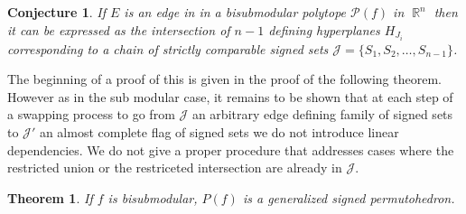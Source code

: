 \documentclass[12pt]{amsart}
\newtheorem{theorem}[lemma]{Theorem}
\newtheorem{conj}[lemma]{Conjecture}
\numberwithin{equation}{section}
\newcommand{\RR}{\operatorname{\mathbb{R}}}
\newcommand{\pp}{\mathcal{P}}
\newcommand{\J}{\mathcal{J}}
\begin{document}
\vspace{.5cm}           %


\begin{conj}
\label{conj:comparableSignedSets}
If $E$ is an edge in in a bisubmodular polytope $\pp(f)$ in $\RR^n$ then it can be expressed 
as the intersection of $n-1$ defining hyperplanes $H_{J_i}$ corresponding
to a chain of strictly comparable signed sets $\J = \{ S_1,  S_2 ,\dots, S_{n-1} \}$.  
\end{conj}

The beginning of a proof of this is given in the proof of the following theorem. However 
as in the sub modular case, it remains to be shown that at each step of a swapping process
to go from $\J$ an arbitrary edge defining family of signed sets to $\J'$ an almost
complete flag of signed sets we do not introduce linear dependencies.  We do not give a proper
procedure that addresses cases where the restricted union or the restriceted intersection
are already in $\J$.   



\begin{theorem}
If $f$ is  bisubmodular, $P(f)$ is a generalized signed permutohedron.
\end{theorem}
\end{document}
